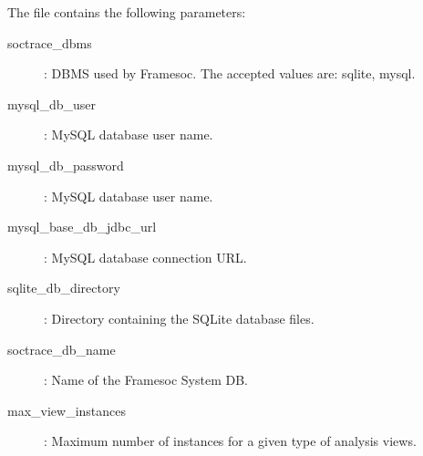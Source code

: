 \documentclass[twoside]{article}
\begin{document}
\begin{sloppypar}
The file contains the following parameters:
\begin{description}
 \item[soctrace\_dbms]: DBMS used by Framesoc. The accepted values are: sqlite, mysql.
 \item[mysql\_db\_user]: MySQL database user name.
 \item[mysql\_db\_password]: MySQL database user name.
 \item[mysql\_base\_db\_jdbc\_url]: MySQL database connection URL.
 \item[sqlite\_db\_directory]: Directory containing the SQLite database files.
 \item[soctrace\_db\_name]: Name of the Framesoc System DB.
 \item[max\_view\_instances]: Maximum number of instances for a given type of analysis views.
\end{description}

\newpage
\renewcommand{\refname}{References}
{}


\end{sloppypar} 
\end{document}
